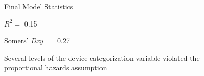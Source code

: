 \documentclass[final]{beamer}
\newlength{\sepwid}
\newlength{\onecolwid}
\newlength{\twocolwid}
\begin{document}
\begin{frame}[t]
\begin{columns}[t]
\begin{column}{\onecolwid}
\begin{block}{Final Model Statistics}
\vspace{0.5ex}

\textcolor{dblue!70}{} $R^2 =$ 0.15

\vspace{0.5ex}

\textcolor{dblue!70}{} Somers' \textit{Dxy} $=$ 0.27

\vspace{0.5ex}

\textcolor{dblue!70}{} Several levels of the device categorization variable violated the proportional hazards assumption

\end{block}


\end{column} %

\begin{column}{\sepwid}\end{column} %

\begin{column}{\twocolwid} %

\begin{columns}[t,totalwidth=\twocolwid] %

\begin{column}{\onecolwid}\vspace{-.6in} %






\end{column} %

\begin{column}{\onecolwid}\vspace{-.6in} %



\end{column}
\end{columns}
\end{column}
\end{columns}
\end{frame}
\end{document}
